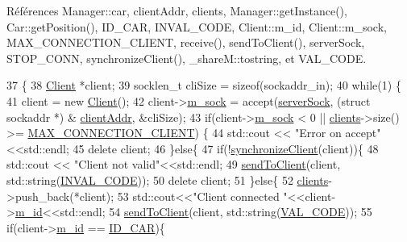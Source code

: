 Références Manager\-::car, client\-Addr, clients, Manager\-::get\-Instance(), Car\-::get\-Position(), I\-D\-\_\-\-C\-A\-R, I\-N\-V\-A\-L\-\_\-\-C\-O\-D\-E, Client\-::m\-\_\-id, Client\-::m\-\_\-sock, M\-A\-X\-\_\-\-C\-O\-N\-N\-E\-C\-T\-I\-O\-N\-\_\-\-C\-L\-I\-E\-N\-T, receive(), send\-To\-Client(), server\-Sock, S\-T\-O\-P\-\_\-\-C\-O\-N\-N, synchronize\-Client(), \-\_\-share\-M\-::tostring, et V\-A\-L\-\_\-\-C\-O\-D\-E.


\begin{DoxyCode}
37                                \{
38     \hyperlink{classClient}{Client} *client;
39     socklen\_t cliSize = \textcolor{keyword}{sizeof}(sockaddr\_in);
40     \textcolor{keywordflow}{while}(1) \{
41         client = \textcolor{keyword}{new} \hyperlink{classClient}{Client}();
42         client->\hyperlink{classClient_a80564d281c880f1e80b6e1b54ae6e71e}{m\_sock} = accept(\hyperlink{classServeur_aff31b98591fc01c7deb0d1ad1052c4a3}{serverSock}, (\textcolor{keyword}{struct} sockaddr *) &
      \hyperlink{classServeur_a326fa962e0672b4da2027f320d561e63}{clientAddr}, &cliSize);
43         \textcolor{keywordflow}{if}(client->\hyperlink{classClient_a80564d281c880f1e80b6e1b54ae6e71e}{m\_sock} < 0 || \hyperlink{classServeur_a1c50d68dd630c95e89f0bb7467f818a6}{clients}->size() >= 
      \hyperlink{definition_8h_a5c060ba02a1c2de42097ec04c0da0ea7}{MAX\_CONNECTION\_CLIENT}) \{
44           std::cout << \textcolor{stringliteral}{"Error on accept"}<<std::endl;
45           \textcolor{keyword}{delete} client;
46         \}\textcolor{keywordflow}{else}\{
47             \textcolor{keywordflow}{if}(!\hyperlink{classServeur_a01ac17dffbd9801773f89f033dfb7f0b}{synchronizeClient}(client))\{
48                 std::cout << \textcolor{stringliteral}{"Client not valid"}<<std::endl;
49                 \hyperlink{classServeur_a5307c171fde619d6441ba9d89aaa3b1a}{sendToClient}(client, std::string(\hyperlink{definition_8h_a6360244e5a8f026f28f31db5966308b4}{INVAL\_CODE}));
50                 \textcolor{keyword}{delete} client;             
51             \}\textcolor{keywordflow}{else}\{
52                 \hyperlink{classServeur_a1c50d68dd630c95e89f0bb7467f818a6}{clients}->push\_back(*client);
53                 std::cout<<\textcolor{stringliteral}{"Client connected "}<<client->\hyperlink{classClient_af29655fb85148cf9cff9c94af770c023}{m\_id}<<std::endl;
54                 \hyperlink{classServeur_a5307c171fde619d6441ba9d89aaa3b1a}{sendToClient}(client, std::string(\hyperlink{definition_8h_a812f73a3ea946dbc24662a8736f64e55}{VAL\_CODE}));
55                 \textcolor{keywordflow}{if}(client->\hyperlink{classClient_af29655fb85148cf9cff9c94af770c023}{m\_id} == \hyperlink{definition_8h_aecf05b6e6a060d8da044532e9db74e2f}{ID\_CAR})\{

\end{DoxyCode}
